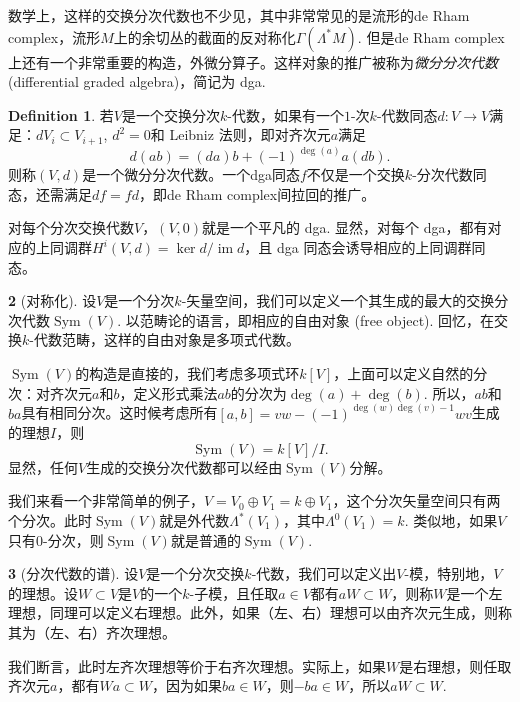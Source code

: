 \documentclass[12pt]{article}
\theoremstyle{definition}
\newtheorem{para}{}[section]
\newtheorem{defi}[para]{Definition}
\theoremstyle{plain}
\begin{document}
数学上，这样的交换分次代数也不少见，其中非常常见的是流形的de Rham complex，流形$M$上的余切丛的截面的反对称化$\Gamma(\Lambda^*M)$. 但是de Rham complex上还有一个非常重要的构造，外微分算子。这样对象的推广被称为\textit{微分分次代数} (differential graded algebra)，简记为 dga. 

\begin{defi}
    若$V$是一个交换分次$k$-代数，如果有一个$1$-次$k$-代数同态$d:V\to V$满足：$dV_i\subset V_{i+1}$, $d^2=0$和 Leibniz 法则，即对齐次元$a$满足
    \[
        d(ab)=(da)b+(-1)^{\deg(a)}a(db).
    \]
    则称$(V,d)$是一个微分分次代数。一个dga同态$f$不仅是一个交换$k$-分次代数同态，还需满足$df=fd$，即de Rham complex间拉回的推广。
\end{defi}

对每个分次交换代数$V$，$(V,0)$就是一个平凡的 dga. 
显然，对每个 dga，都有对应的上同调群$H^i(V,d)=\ker d/\operatorname{im} d$，且 dga 同态会诱导相应的上同调群同态。

\begin{para}[对称化]
    设$V$是一个分次$k$-矢量空间，我们可以定义一个其生成的最大的交换分次代数$\operatorname{Sym}(V)$. 以范畴论的语言，即相应的自由对象 (free object). 回忆，在交换$k$-代数范畴，这样的自由对象是多项式代数。

    $\operatorname{Sym}(V)$的构造是直接的，我们考虑多项式环$k[V]$，上面可以定义自然的分次：对齐次元$a$和$b$，定义形式乘法$ab$的分次为$\deg(a)+\deg(b)$. 所以，$ab$和$ba$具有相同分次。这时候考虑所有$[a,b]=vw-(-1)^{\deg(w)\deg(v)-1}wv$生成的理想$I$，则
    \[
        \operatorname{Sym}(V)=k[V]/I.
    \]
    显然，任何$V$生成的交换分次代数都可以经由$\operatorname{Sym}(V)$分解。
\end{para}

我们来看一个非常简单的例子，$V=V_0\oplus V_1=k\oplus V_1$，这个分次矢量空间只有两个分次。此时$\operatorname{Sym}(V)$就是外代数$\Lambda^*(V_1)$，其中$\Lambda^0(V_1)=k$. 类似地，如果$V$只有$0$-分次，则$\operatorname{Sym}(V)$就是普通的$\operatorname{Sym}(V)$.

\begin{para}[分次代数的谱]
    设$V$是一个分次交换$k$-代数，我们可以定义出$V$-模，特别地，$V$的理想。设$W\subset V$是$V$的一个$k$-子模，且任取$a\in V$都有$aW\subset W$，则称$W$是一个左理想，同理可以定义右理想。此外，如果（左、右）理想可以由齐次元生成，则称其为（左、右）齐次理想。

    我们断言，此时左齐次理想等价于右齐次理想。实际上，如果$W$是右理想，则任取齐次元$a$，都有$Wa\subset W$，因为如果$ba\in W$，则$-ba\in W$，所以$aW\subset W$.
\end{para}
\end{document}
